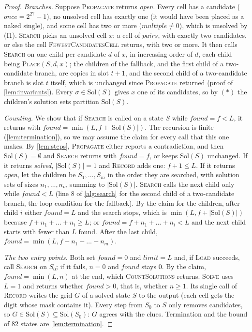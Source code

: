 \documentclass[11pt]{article}
\theoremstyle{definition}
\theoremstyle{plain}
\let\origtextsc\textsc
\renewcommand{\textsc}[1]{\textup{\origtextsc{#1}}}
\begin{document}
\begin{proof}
\emph{Branches.} Suppose \textsc{Propagate} returns \emph{open}. Every cell has a candidate
($\mathit{once}=2^{27}-1$), no unsolved cell has exactly one (it would have been placed as a naked single), and some
cell has two or more ($\mathit{multiple}\neq 0$), which is unsolved by (I1). \textsc{Search} picks an unsolved cell
$x$: a cell of $\mathit{pairs}$, with exactly two candidates, or else the cell \textsc{FewestCandidatesCell} returns,
with two or more. It then calls \textsc{Search} on one child per candidate $d$ of $x$, in increasing order of $d$,
each child being \textsc{Place}$(S,d,x)$; the children of the fallback, and the first child of a two-candidate branch,
are copies in slot $t+1$, and the second child of a two-candidate branch is slot $t$ itself, which is unchanged since
\textsc{Propagate} returned (proof of \cref{lem:invariants}). Every $\sigma\in\mathrm{Sol}(S)$ gives $x$ one of its
candidates, so by $(*)$ the children's solution sets partition $\mathrm{Sol}(S)$.

\emph{Counting.} We show that if \textsc{Search} is called on a state $S$ while $\mathit{found}=f<L$, it returns with
$\mathit{found}=\min(L, f+|\mathrm{Sol}(S)|)$. The recursion is finite (\cref{lem:termination}), so we may assume the
claim for every call that this one makes. By \cref{lem:steps}, \textsc{Propagate} either reports a contradiction, and
then $\mathrm{Sol}(S)=\emptyset$ and \textsc{Search} returns with $\mathit{found}=f$, or keeps $\mathrm{Sol}(S)$
unchanged. If it returns \emph{solved}, $|\mathrm{Sol}(S)|=1$ and \textsc{Record} adds one: $f+1\le L$. If it returns
\emph{open}, let the children be $S_1,\dots,S_m$ in the order they are searched, with solution sets of sizes
$n_1,\dots,n_m$ summing to $|\mathrm{Sol}(S)|$. \textsc{Search} calls the next child only while $\mathit{found}<L$
(line 8 of \cref{alg:search} for the second child of a two-candidate branch, the loop condition for the fallback). By
the claim for the children, after child $i$ either $\mathit{found}=L$ and the search stops, which is
$\min(L, f+|\mathrm{Sol}(S)|)$ because $f+n_1+\dots+n_i\ge L$; or $\mathit{found}=f+n_1+\dots+n_i<L$ and the next child
starts with fewer than $L$ found. After the last child, $\mathit{found}=\min(L, f+n_1+\dots+n_m)$.

\emph{The two entry points.} Both set $\mathit{found}=0$ and $\mathit{limit}=L$ and, if \textsc{Load} succeeds, call
\textsc{Search} on $S_0$; if it fails, $n=0$ and $\mathit{found}$ stays 0. By the claim, $\mathit{found}=\min(L,n)$ at
the end, which \textsc{CountSolutions} returns. \textsc{Solve} uses $L=1$ and returns whether $\mathit{found}>0$, that
is, whether $n\ge 1$. Its single call of \textsc{Record} writes the grid $G$ of a solved state $S$ to the output (each
cell gets the digit whose mask contains it). Every step from $S_0$ to $S$ only removes candidates, so
$G\in\mathrm{Sol}(S)\subseteq\mathrm{Sol}(S_0)$: $G$ agrees with the clues. Termination and the bound of 82 states are
\cref{lem:termination}.
\end{proof}
\end{document}
